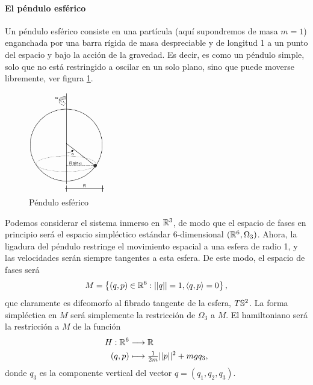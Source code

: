    \paragraph{\bf El péndulo esférico}\mbox{}

   Un péndulo esférico consiste en una partícula (aquí supondremos de masa $m=1$) enganchada por una barra rígida de masa despreciable y de longitud 1 a un punto del espacio y bajo la acción de la gravedad. Es decir, es como un péndulo simple, solo que no está restringido a oscilar en un solo plano, sino que puede moverse libremente, ver figura \ref{fig:espendulo}.
\begin{figure}[h]
  \centering
  \includegraphics[width=0.3\textwidth]{pics/espendulo.png}
  \caption{\small Péndulo esférico}
  \label{fig:espendulo}
\end{figure}

Podemos considerar el sistema inmerso en $\mathbb{R}^3$, de modo que el espacio de fases en principio será el espacio simpléctico estándar $6$-dimensional $(\mathbb{R}^6,\Omega_3)$. Ahora, la ligadura del péndulo restringe el movimiento espacial a una esfera de radio 1, y las velocidades serán siempre tangentes a esta esfera. De este modo, el espacio de fases será
\begin{equation*}
  M=\left\{ (q,p)\in \mathbb{R}^6 : ||q||=1, \left\langle q,p\right\rangle=0 \right\},
\end{equation*}
que claramente es difeomorfo al fibrado tangente de la esfera, $T\mathbb{S}^2$. La forma simpléctica en $M$ será simplemente la restricción de $\Omega_3$ a $M$. El hamiltoniano será la restricción a $M$ de la función 
\begin{align*}
  H :\mathbb{R}^6&\longrightarrow \mathbb{R}\\ 
  (q,p) &\longmapsto \tfrac{1}{2m}||p||^2+mgq_3, 
  \end{align*}
  donde $q_3$ es la componente vertical del vector $q=(q_1,q_2,q_3)$.

